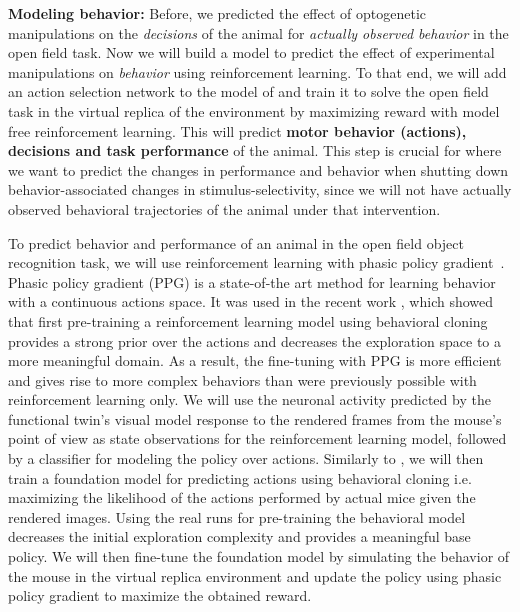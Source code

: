 \documentclass[B2,COG]{ercgrant}
\begin{document}
\textbf{Modeling behavior:} 
Before, we predicted the effect of optogenetic manipulations on the \textit{decisions} of the animal for \textit{actually observed behavior} in the open field task. 
Now we will build a model to predict the effect of experimental manipulations on \textit{behavior} using reinforcement learning.
To that end, we will add an action selection network to the model of  and train it to solve the open field task in the virtual replica of the environment by maximizing reward with model free reinforcement learning.
This will predict \textbf{motor behavior (actions), decisions and task performance} of the animal. 
This step is crucial for  where we want to predict the changes in performance and behavior when shutting down behavior-associated changes in stimulus-selectivity, since we will not have actually observed behavioral trajectories of the animal under that intervention. 

To predict behavior and performance of an animal in the open field object recognition task, we will use reinforcement learning with phasic policy gradient~\parencite[PPG,][]{Cobbe2021-op}. 
Phasic policy gradient (PPG) is a state-of-the art method for learning behavior with a continuous actions space. 
It was used in the recent work \cite{Baker2022-ph}, which showed that first pre-training a reinforcement learning model using behavioral cloning provides a strong prior over the actions and decreases the exploration space to a more meaningful domain. 
As a result, the fine-tuning with PPG is more efficient and gives rise to more complex behaviors than were previously possible with reinforcement learning only.
We will use the neuronal activity predicted by the functional twin's visual model response to the rendered frames from the mouse's point of view as state observations for the reinforcement learning model, followed by a classifier for modeling the policy over actions.
Similarly to \cite{Baker2022-ph}, we will then train a foundation model for predicting actions using behavioral cloning i.e. maximizing the likelihood of the actions performed by actual mice given the rendered images.
Using the real runs for pre-training the behavioral model decreases the initial exploration complexity and provides a meaningful base policy.
We will then fine-tune the foundation model by simulating the behavior of the mouse in the virtual replica environment and update the policy using phasic policy gradient \parencite{Cobbe2021-op} to maximize the obtained reward.
\end{document}
